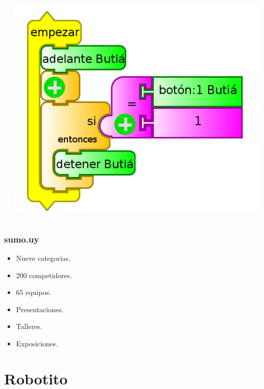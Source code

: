 \documentclass[spanish]{beamer}
\begin{document}
\begin{frame}
\begin{columns}[T]
\begin{column}{.33\textwidth}
    \end{column}
    \begin{column}{.33\textwidth}
    \includegraphics[width=\textwidth]{tortuga.png}
    \end{column}
  \end{columns}
\end{frame}

\begin{frame}
\frametitle{sumo.uy}
	\begin{itemize}
		\item Nueve categorías.
		\item 200 competidores.
		\item 65 equipos.
		\item Presentaciones.
		\item Talleres.
		\item Exposiciones.
	\end{itemize}
\end{frame}

\section{Robotito}
\end{document}
